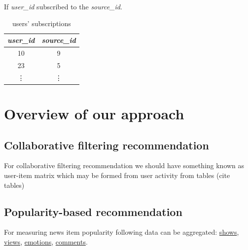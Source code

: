 \documentclass{article}
\begin{document}
    If \emph{user\_id} subscribed to the \emph{source\_id}.

    \begin{table}[h]
        \centering
        \begin{tabular}{cc}
            \toprule

            \emph{user\_id} & \emph{source\_id} \\\midrule

            10 & 9  \\
            23 & 5  \\
            \vdots & \vdots  \\\bottomrule

        \end{tabular}

        \caption{users' subscriptions}
        \label{tab:subscriptions}
    \end{table}




    \section{Overview of our approach}
    \label{sec:overview}

    \subsection{Collaborative filtering recommendation}

    For collaborative filtering recommendation we should have something known as user-item matrix which may be formed from user activity from tables (cite tables)

    \subsection{Popularity-based recommendation}

    For measuring news item popularity following data can be aggregated: \hyperref[tab:show]{shows}, \hyperref[tab:view]{views}, \hyperref[tab:emotion]{emotions}, \hyperref[tab:comment]{comments}.
\end{document}
